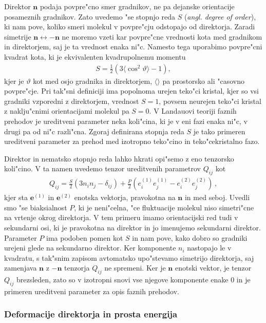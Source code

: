 \documentclass[a4paper,10pt]{article}
\newcommand{\angl}[1]{(\textit{angl. #1})}
\begin{document}
Direktor $\mathbf{n}$ podaja povpre"cno smer gradnikov, ne pa dejanske orientacije posameznih gradnikov. 
Zato uvedemo "se stopnjo reda $S$ \angl{degree of order}, ki nam pove, koliko smeri molekul v povpre"cju odstopajo od direktorja. 
Zaradi simetrije $\mathbf{n} \leftrightarrow -\mathbf{n}$ ne moremo vzeti kar povpre"cne vrednosti kota med gradnikom in direktorjem, saj je ta vrednost enaka ni"c. 
Namesto tega uporabimo povpre"cni kvadrat kota, ki je ekvivalenten kvadrupolnemu momentu\cite{kleman}
\begin{align}
 S = \frac{1}{2}\left(3\langle\cos^2\vartheta\rangle-1\right),
\end{align}
kjer je $\vartheta$ kot med osjo gradnika in direktorjem, $\langle\rangle$ pa prostorsko ali "casovno povpre"cje. 
Pri tak"sni definiciji ima popolnoma urejen teko"ci kristal, kjer so vsi gradniki vzporedni z direktorjem, vrednost $S=1$, povsem neurejen teko"ci kristal z naklju"cnimi orientacijami molekul pa $S=0$. 
V Landauovi teoriji faznih prehodov je ureditveni parameter neka koli"cina, ki je v eni fazi enaka ni"c, v drugi pa od ni"c razli"cna. 
Zgoraj definirana stopnja reda $S$ je tako primeren ureditveni parameter za prehod med izotropno teko"cino in teko"cekristalno fazo\cite{degennes}. 

Direktor in nematsko stopnjo reda lahko hkrati opi"semo z eno tenzorsko koli"cino. V ta namen uvedemo tenzor ureditvenih parametrov $Q_{ij}$ kot
\begin{align}
  Q_{ij} = \frac{S}{2}(3n_i n_j - \delta_{ij}) + \frac{P}{2}(e^{(1)}_i e^{(1)}_j - e^{(2)}_i e^{(2)}_j)\,,
\end{align}
kjer sta $\mathbf{e}^{(1)}$ in $\mathbf{e}^{(2)}$ enotska vektorja, pravokotna na $\mathbf{n}$ in med seboj. Uvedli smo "se biaksialnost $P$, ki je neni"celna, "ce fluktuacije molekul niso simetri"cne na vrtenje okrog direktorja. V tem primeru imamo orientacijski red tudi v sekundarni osi, ki je pravokotna na direktor in jo imenujemo sekundarni direktor. Parameter $P$ ima podoben pomen kot $S$ in nam pove, kako dobro so gradniki urejeni glede na sekundarno direktor. Ker komponente $n_i$ nastopajo le v kvadratu, s tak"snim zapisom avtomatsko upo"stevamo simetrijo direktorja, saj zamenjava $\mathbf{n}$ z $-\mathbf{n}$ tenzorja $Q_{ij}$ ne spremeni. Ker je $\mathbf{n}$ enotski vektor, je tenzor $Q_{ij}$ brezsleden, zato so v izotropni snovi vse njegove komponente enake 0 in je primeren ureditveni parameter za opis faznih prehodov. 

\subsubsection{Deformacije direktorja in prosta energija}
\end{document}
